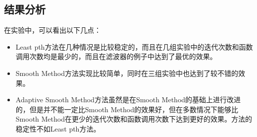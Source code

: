 \documentclass{ctexart}
\begin{document}
\subsection{结果分析}
在实验中，可以看出以下几点：
\begin{itemize}
\item Least pth方法在几种情况是比较稳定的，而且在几组实验中的迭代次数和函数调用次数均是最少的，而且在滤波器的例子中达到了最优的效果。
\item Smooth Method方法实现比较简单，同时在三组实验中也达到了较不错的效果。
\item Adaptive Smooth Method方法虽然是在Smooth Method的基础上进行改进的，但是并不能一定比Smooth Method的效果好，但在多数情况下能够比Smooth Method在更少的迭代次数和函数调用次数下达到更好的效果。方法的稳定性不如Least pth方法。
\end{itemize}


\end{document}
